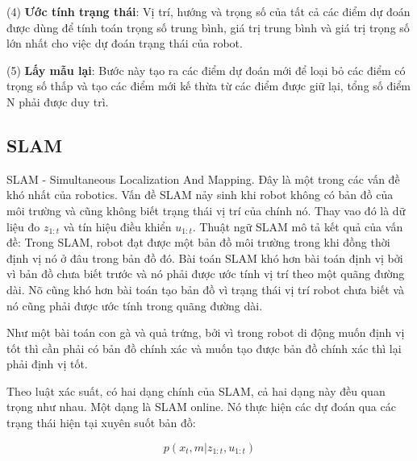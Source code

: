 (4) \textbf{Ước tính trạng thái}: Vị trí, hướng và trọng số của tất cả các điểm dự đoán được dùng để tính toán trọng số trung bình, giá trị trung bình và giá trị trọng số lớn nhất cho việc dự đoán trạng thái của robot.

(5) \textbf{Lấy mẫu lại}: Bước này tạo ra các điểm dự đoán mới để loại bỏ các điểm có trọng số thấp và tạo các điểm mới kế thừa từ các điểm được giữ lại, tổng số điểm N phải được duy trì.

\subsection{SLAM}

SLAM - Simultaneous Localization And Mapping. Đây là một trong các vấn đề khó nhất của robotics. Vấn đề SLAM nảy sinh khi robot không có bản đồ của môi trường và cũng không biết trạng thái vị trí của chính nó. Thay vao đó là dữ liệu đo ${z}_{1:t}$ và tín hiệu điều khiển ${u}_{1:t}$. Thuật ngữ SLAM mô tả kết quả của vấn đề: Trong SLAM, robot đạt được một bản đồ môi trường trong khi đồng thời định vị nó ở đâu trong bản đồ đó. Bài toán SLAM khó hơn bài toán định vị bởi vì bản đồ chưa biết trước và nó phải được ước tính vị trí theo một quãng đường dài. Nõ cũng khó hơn bài toán tạo bản đồ vì trạng thái vị trí robot chưa biết và nó cũng phải được ước tính trong quãng đường dài.

Như một bài toán con gà và quả trứng, bởi vì trong robot di động muốn định vị tốt thì cần phải có bản đồ chính xác và muốn tạo được bản đồ chính xác thì lại phải định vị tốt.

Theo luật xác suất, có hai dạng chính của SLAM, cả hai dạng này đều quan trọng như nhau. Một dạng là SLAM online. Nó thực hiện các dự đoán qua các trạng thái hiện tại xuyên suốt bản đồ:

\begin{equation}
  p\left({x}_{t}, m | {z}_{1:t}, {u}_{1:t}\right)
\end{equation}

